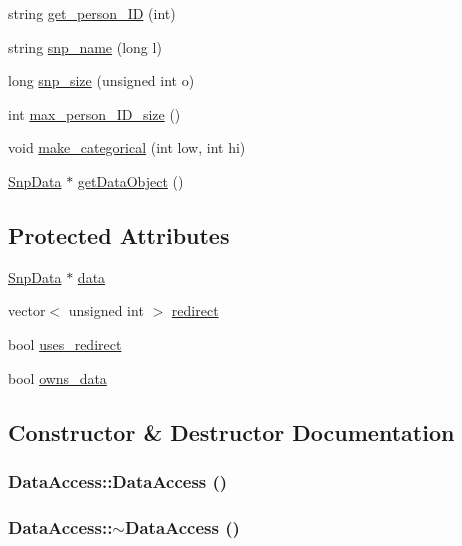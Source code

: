 \begin{DoxyCompactItemize}
string \hyperlink{classDataAccess_ae446b940e538a5d09f651c4908e08804}{get\_\-person\_\-ID} (int)
\item 
string \hyperlink{classDataAccess_ad58bd17d7e8f99412d453570b2ac3be8}{snp\_\-name} (long l)
\item 
long \hyperlink{classDataAccess_a97e83c12c8798f13bedcacdcc6e75178}{snp\_\-size} (unsigned int o)
\item 
int \hyperlink{classDataAccess_a5ff27046517657f20a3672d946e0fb47}{max\_\-person\_\-ID\_\-size} ()
\item 
void \hyperlink{classDataAccess_a3f3a33a79e44ba86fa1516e965a7348c}{make\_\-categorical} (int low, int hi)
\item 
\hyperlink{classSnpData}{SnpData} $\ast$ \hyperlink{classDataAccess_adcb83e7fdf831ae7b22902ccec055daa}{getDataObject} ()
\end{DoxyCompactItemize}
\subsection*{Protected Attributes}
\begin{DoxyCompactItemize}
\item 
\hyperlink{classSnpData}{SnpData} $\ast$ \hyperlink{classDataAccess_a37987750a9f946993ddad2245a8c5c54}{data}
\item 
vector$<$ unsigned int $>$ \hyperlink{classDataAccess_a642900c2d22f2b850213d46fe819206c}{redirect}
\item 
bool \hyperlink{classDataAccess_ac49207f016cee4af4c245c8c7fd5fb60}{uses\_\-redirect}
\item 
bool \hyperlink{classDataAccess_a227068cc74d5c6d3f001d32ebf24a06e}{owns\_\-data}
\end{DoxyCompactItemize}


\subsection{Constructor \& Destructor Documentation}
\hypertarget{classDataAccess_af99b77ec290d1e723d0540ba9d9a95ba}{
\subsubsection[{DataAccess}]{\setlength{\rightskip}{0pt plus 5cm}DataAccess::DataAccess ()}}
\label{classDataAccess_af99b77ec290d1e723d0540ba9d9a95ba}
\hypertarget{classDataAccess_a02d65c4dff5b263dddb2d90d695fbe0e}{
\subsubsection[{$\sim$DataAccess}]{\setlength{\rightskip}{0pt plus 5cm}DataAccess::$\sim$DataAccess ()}}
\label{classDataAccess_a02d65c4dff5b263dddb2d90d695fbe0e}


